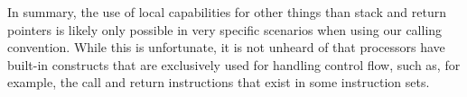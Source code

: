 \documentclass[format=acmsmall, review=true, screen=true]{acmart}
\begin{document}
In summary, the use of local capabilities for other things than stack and return
pointers is likely only possible in very specific scenarios when using our
calling convention. While this is unfortunate, it is not unheard of that
processors have built-in constructs that are exclusively used for handling
control flow, such as, for example, the call and return instructions that exist
in some instruction sets.
\end{document}
